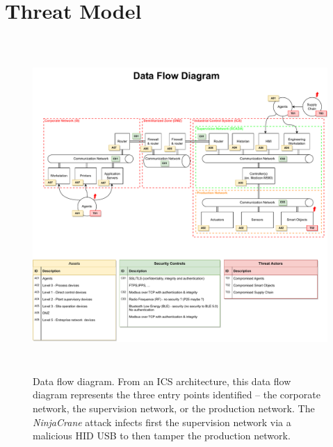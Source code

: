 \chapter{Threat Model}
\label{ch:threat_model}
\begin{figure}[H]
    \centering
    \vspace{-1.5cm}
    \includegraphics[height=12.7cm, angle=00, trim={0cm 0cm 0cm 2cm},clip]{figures/Threat-modelling-DFD.pdf}
    \caption{Data flow diagram. From an ICS architecture, this data flow diagram represents the three entry points identified – the corporate network, the supervision network, or the production network. The \emph{NinjaCrane} attack infects first the supervision network via a malicious HID USB to then tamper the production network.}
    \label{fig:data_flow_diagram}
\end{figure}

